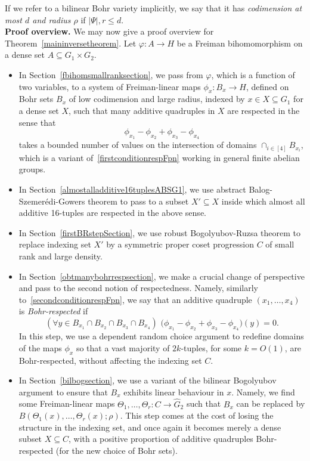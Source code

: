 \documentclass[a4paper,11pt]{article}
\numberwithin{theorem}{section}
\theoremstyle{definition}
\begin{document}
If we refer to a bilinear Bohr variety implicitly, we say that it has \textit{codimension at most $d$ and radius $\rho$} if $|\Psi|, r \leq d$.\\

\noindent\textbf{Proof overview.} We may now give a proof overview for Theorem~\ref{maininversetheorem}. Let $\varphi: A \to H$ be a Freiman bihomomorphism on a dense set $A \subseteq G_1 \times G_2$.

\begin{itemize}
    \item[\textbf{Step 1.}] In Section~\ref{fbihomsmallranksection}, we pass from $\varphi$, which is a function of two variables, to a system of Freiman-linear maps $\phi_x : B_x \to H$, defined on Bohr sets $B_x$ of low codimension and large radius, indexed by $x \in X \subseteq G_1$ for a dense set $X$, such that many additive quadruples in $X$ are respected in the sense that 
    \[\phi_{x_1} - \phi_{x_2} + \phi_{x_3} - \phi_{x_4}\]
    takes a bounded number of values on the intersection of domains $\cap_{i \in [4]} B_{x_i}$, which is a variant of~\eqref{firstconditionrespFpn} working in general finite abelian groups.
    \item[\textbf{Step 2.}] In Section~\ref{almostalladditive16tuplesABSG1}, we use abstract Balog-Szemer\'edi-Gowers theorem to pass to a subset $X' \subseteq X$ inside which almost all additive 16-tuples are respected in the above sense.
    \item[\textbf{Step 3.}] In Section~\ref{firstBRstepSection}, we use robust Bogolyubov-Ruzsa theorem to replace indexing set $X'$ by a symmetric proper coset progression $C$ of small rank and large density.
    \item[\textbf{Step 4.}] In Section~\ref{obtmanybohrrespsection}, we make a crucial change of perspective and pass to the second notion of respectedness. Namely, similarly to~\eqref{secondconditionrespFpn}, we say that an additive quadruple $(x_1, \dots, x_4)$ is \textit{Bohr-respected} if 
    \[(\forall y \in B_{x_1} \cap B_{x_2} \cap B_{x_3} \cap B_{x_4})\,\, \Big(\phi_{x_1} - \phi_{x_2} + \phi_{x_3} - \phi_{x_4}\Big)(y) = 0.\]
    In this step, we use a dependent random choice argument to redefine domains of the maps $\phi_x$ so that a vast majority of $2k$-tuples, for some $k = O(1)$, are Bohr-respected, without affecting the indexing set $C$.
    \item[\textbf{Step 5.}] In Section~\ref{bilbogsection}, we use a variant of the bilinear Bogolyubov argument to ensure that $B_x$ exhibits linear behaviour in $x$. Namely, we find some Freiman-linear maps $\Theta_1, \dots, \Theta_r : C \to \hat{G}_2$ such that $B_x$ can be replaced by $B(\Theta_1(x), \dots, \Theta_r(x); \rho)$. This step comes at the cost of losing the structure in the indexing set, and once again it becomes merely a dense subset $X \subseteq C$, with a positive proportion of additive quadruples Bohr-respected (for the new choice of Bohr sets).

\end{itemize}
\end{document}

